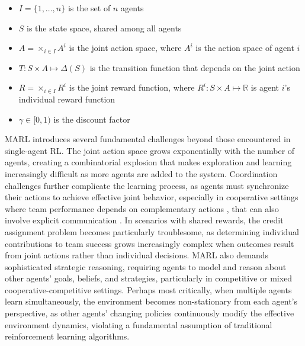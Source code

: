 \documentclass[a4paper,12pt]{report}
\begin{document}
\begin{itemize}
    \item $I = \{1, \ldots, n\}$ is the set of $n$ agents
    \item $S$ is the state space, shared among all agents
    \item $A = \times_{i \in I} A^i$ is the joint action space, where $A^i$ is the action space of agent $i$
    \item $T: S \times A \mapsto \Delta(S)$ is the transition function that depends on the joint action
    \item $R = \times_{i \in I} R^i$ is the joint reward function, where $R^i: S \times A \mapsto \mathbb{R}$ is agent $i$'s individual reward function
    \item $\gamma \in [0, 1)$ is the discount factor
\end{itemize}
MARL introduces several fundamental challenges beyond those encountered in single-agent RL. The joint action space grows exponentially with the number of agents, creating a combinatorial explosion that makes exploration and learning increasingly difficult as more agents are added to the system. Coordination challenges further complicate the learning process, as agents must synchronize their actions to achieve effective joint behavior, especially in cooperative settings where team performance depends on complementary actions \cite{du2023reviewcooperationmultiagentlearning}, that can also involve explicit communication \cite{zhu2024surveymultiagentdeepreinforcement}. In scenarios with shared rewards, the credit assignment problem becomes particularly troublesome, as determining individual contributions to team success grows increasingly complex when outcomes result from joint actions rather than individual decisions. MARL also demands sophisticated strategic reasoning, requiring agents to model and reason about other agents' goals, beliefs, and strategies, particularly in competitive or mixed cooperative-competitive settings. Perhaps most critically, when multiple agents learn simultaneously, the environment becomes non-stationary from each agent's perspective, as other agents' changing policies continuously modify the effective environment dynamics, violating a fundamental assumption of traditional reinforcement learning algorithms.
\end{document}
